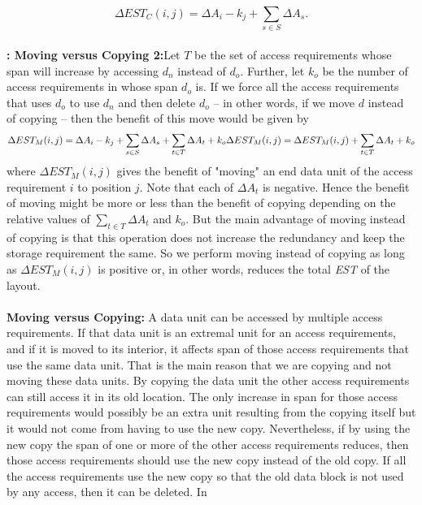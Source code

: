 \begin{equation}
\Delta EST_C(i,j) = \Delta A_i - k_j + \sum_{s\in S}\Delta{A_s}.
\label{eq:copyingcost}
\end{equation}
\\
{\bf: Moving versus Copying 2:}Let $T$ be the set of access requirements whose span will increase by accessing $d_n$ instead of $d_o$. Further, let $k_o$ be the number of access requirements in whose span $d_o$ is. If we force all the access requirements that uses $d_o$ to use $d_n$ and then delete $d_o$ -- in other words, if we move $d$ instead of copying -- then the benefit of this move would be given by
\begin{equation}
 \Delta EST_M(i,j) = \Delta A_i - k_j + \sum_{s\in S}\Delta{A_s} + \sum_{t\in T}\Delta{A_t} + k_o \\
 \Delta EST_M(i,j) = \Delta EST_M(i,j) + \sum_{t\in T}\Delta{A_t} + k_o \\
\label{eq:movingcost}
\end{equation}
where $\Delta EST_M(i,j)$ gives the benefit of "moving" an end data unit of the access requirement $i$ to position $j$. Note that each of $\Delta A_t$ is negative. Hence the benefit of moving might be more or less than the benefit of copying depending on the relative values of $\sum_{t\in T}\Delta{A_t}$ and $k_o$. But the main advantage of moving instead of copying is that this operation does not increase the redundancy and keep the storage requirement the same. So we perform moving instead of copying as long as $\Delta EST_M(i,j)$ is positive or, in other words, reduces the total {\em EST} of the layout.\\
\\
{\bf Moving versus Copying:} A data unit can be accessed by multiple access
requirements. If that data unit is an extremal unit for an access
requirements, and if it is moved to its interior, it affects span of those access
requirements that use the
same data unit. That is the main reason that we are copying and not moving
these data units. 
By copying the data unit the other access requirements can
still access it in its old location. The only increase in span for those access requirements would possibly be an extra unit resulting from the copying itself but it would not come from having to use the new copy.
Nevertheless, if by using the new copy the span of one or more of the other
access requirements reduces, then those access requirements should use the new
copy instead of the old copy. If all the access requirements use the new copy
so that the old data block is not used by any access, then it can be deleted. In
